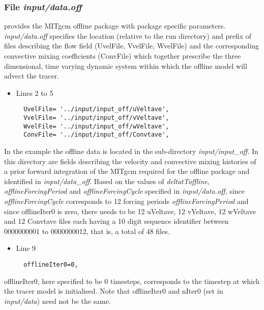 \subsubsection{File {\it input/data.off}}
\label{www:tutorials}

 provides the MITgcm offline package
with package specific parameters. {\it input/data.off} specifies the
location (relative to the run directory) and prefix of files
describing the flow field (UvelFile, VvelFile, WvelFile) and the
corresponding convective mixing coefficients (ConvFile) which together
prescribe the three dimensional, time varying dynamic system within
which the offline model will advect the tracer.

\begin{itemize}
\item Lines 2 to 5
\begin {verbatim}
  UvelFile= '../input/input_off/uVeltave',
  VvelFile= '../input/input_off/vVeltave',
  WvelFile= '../input/input_off/wVeltave',
  ConvFile= '../input/input_off/Convtave',
\end{verbatim}
\end{itemize}

\noindent In the example the offline data is located in the
sub-directory {\it input/input\_off}. In this directory are fields
describing the velocity and convective mixing histories of a prior
forward integration of the MITgcm required for the offline package and
identified in {\it input/data\_off}. Based on the values of {\it
  deltatToffline}, {\it offlineForcingPeriod} and {\it
  offlineForcingCycle} specified in {\it input/data.off}, since {\it
  offlineForcingCycle} corresponds to 12 forcing periods {\it
  offlineForcingPeriod} and since offlineIter0 is zero, there needs to
be 12 uVeltave, 12 vVeltave, 12 wVeltave and 12 Convtave files each
having a 10 digit sequence identifier between 0000000001 to
0000000012, that is, a total of 48 files.


\begin{itemize}
\item Line 9
\begin {verbatim}
  offlineIter0=0,
\end{verbatim}
\end{itemize}

\noindent offlineIter0, here specified to be 0 timesteps, corresponds
to the timestep at which the tracer model is initialised. Note that
offlineIter0 and nIter0 (set in {\it input/data}) need not be the
same.

